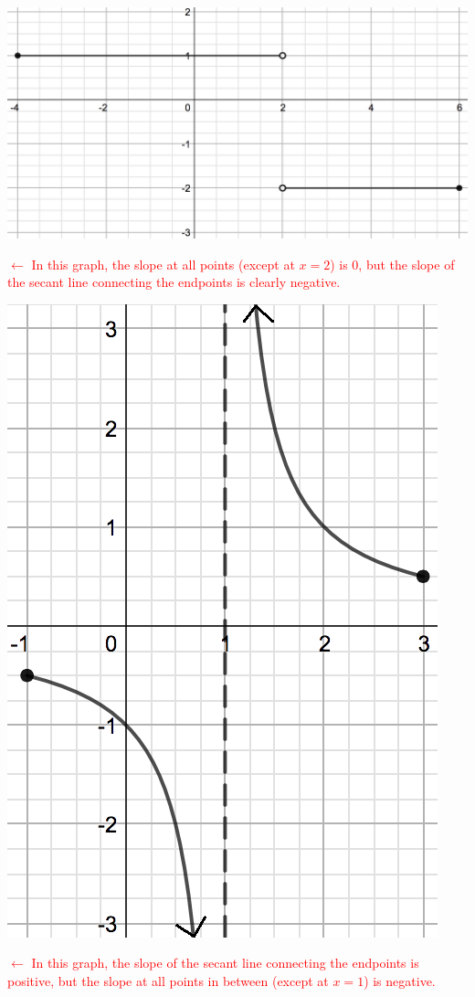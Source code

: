 \documentclass[12pt]{report}
\begin{document}
\bigskip

\begin{multicols}{2}
\includegraphics[scale=0.3]{MVT3.png}

\textcolor{red}{$\longleftarrow$ In this graph, the slope at all points (except at $x=2$) is 0, but the slope of the secant line connecting the endpoints is clearly negative.}
\end{multicols}

\bigskip

\begin{multicols}{2}
\includegraphics[scale=0.5]{MVT5edited.png}

\textcolor{red}{$\longleftarrow$ In this graph, the slope of the secant line connecting the endpoints is positive, but the slope at all points in between (except at $x=1$) is negative.}

\end{multicols}
\end{document}
